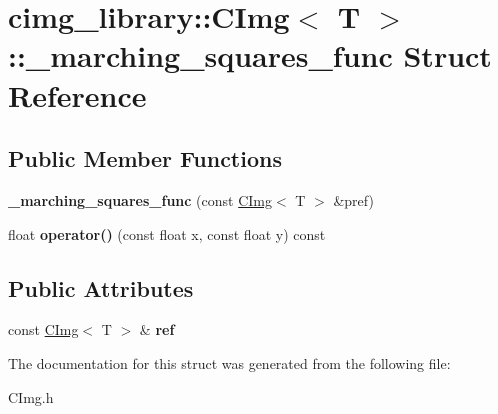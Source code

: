 \hypertarget{structcimg__library_1_1_c_img_1_1__marching__squares__func}{\section{cimg\-\_\-library\-:\-:C\-Img$<$ T $>$\-:\-:\-\_\-marching\-\_\-squares\-\_\-func Struct Reference}
\label{structcimg__library_1_1_c_img_1_1__marching__squares__func}
}
\subsection*{Public Member Functions}
\begin{DoxyCompactItemize}
\item 
\hypertarget{structcimg__library_1_1_c_img_1_1__marching__squares__func_a85354185fd6b71ffb63e44146d811887}{{\bfseries \-\_\-marching\-\_\-squares\-\_\-func} (const \hyperlink{structcimg__library_1_1_c_img}{C\-Img}$<$ T $>$ \&pref)}\label{structcimg__library_1_1_c_img_1_1__marching__squares__func_a85354185fd6b71ffb63e44146d811887}

\item 
\hypertarget{structcimg__library_1_1_c_img_1_1__marching__squares__func_aa857bfd84acce9b6748778f6bbcf0c23}{float {\bfseries operator()} (const float x, const float y) const }\label{structcimg__library_1_1_c_img_1_1__marching__squares__func_aa857bfd84acce9b6748778f6bbcf0c23}

\end{DoxyCompactItemize}
\subsection*{Public Attributes}
\begin{DoxyCompactItemize}
\item 
\hypertarget{structcimg__library_1_1_c_img_1_1__marching__squares__func_a011fd20127c3336f0285d7bf86d3e5ad}{const \hyperlink{structcimg__library_1_1_c_img}{C\-Img}$<$ T $>$ \& {\bfseries ref}}\label{structcimg__library_1_1_c_img_1_1__marching__squares__func_a011fd20127c3336f0285d7bf86d3e5ad}

\end{DoxyCompactItemize}


The documentation for this struct was generated from the following file\-:\begin{DoxyCompactItemize}
\item 
C\-Img.\-h\end{DoxyCompactItemize}
